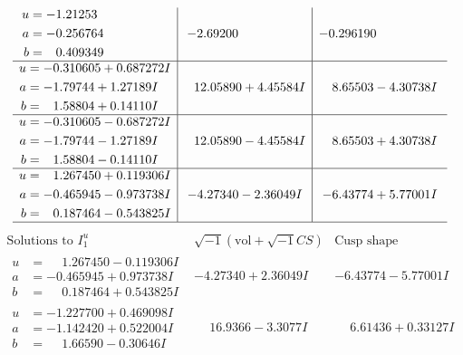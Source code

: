 \documentclass[1p]{elsarticle_modified}
\theoremstyle{definition}
\newcommand{\I}{\sqrt{-1}}
\begin{document}
$$\begin{array}{c|c|c}
\begin{aligned}
u &= -1.21253\phantom{ +0.000000I} \\
a &= -0.256764\phantom{ +0.000000I} \\
b &= \phantom{-}0.409349\phantom{ +0.000000I}\end{aligned}
 & -2.69200\phantom{ +0.000000I} & -0.296190\phantom{ +0.000000I} \\ \hline\begin{aligned}
u &= -0.310605 + 0.687272 I \\
a &= -1.79744 + 1.27189 I \\
b &= \phantom{-}1.58804 + 0.14110 I\end{aligned}
 & \phantom{-}12.05890 + 4.45584 I & \phantom{-}8.65503 - 4.30738 I \\ \hline\begin{aligned}
u &= -0.310605 - 0.687272 I \\
a &= -1.79744 - 1.27189 I \\
b &= \phantom{-}1.58804 - 0.14110 I\end{aligned}
 & \phantom{-}12.05890 - 4.45584 I & \phantom{-}8.65503 + 4.30738 I \\ \hline\begin{aligned}
u &= \phantom{-}1.267450 + 0.119306 I \\
a &= -0.465945 - 0.973738 I \\
b &= \phantom{-}0.187464 - 0.543825 I\end{aligned}
 & -4.27340 - 2.36049 I & -6.43774 + 5.77001 I\\
 \hline 
 \end{array}$$\newpage$$\begin{array}{c|c|c}  
\text{Solutions to }I^u_{1}& \I (\text{vol} + \sqrt{-1}CS) & \text{Cusp shape}\\
 \hline 
\begin{aligned}
u &= \phantom{-}1.267450 - 0.119306 I \\
a &= -0.465945 + 0.973738 I \\
b &= \phantom{-}0.187464 + 0.543825 I\end{aligned}
 & -4.27340 + 2.36049 I & -6.43774 - 5.77001 I \\ \hline\begin{aligned}
u &= -1.227700 + 0.469098 I \\
a &= -1.142420 + 0.522004 I \\
b &= \phantom{-}1.66590 - 0.30646 I\end{aligned}
 & \phantom{-}16.9366 - 3.3077 I & \phantom{-}6.61436 + 0.33127 I \\ \hline\begin{aligned}

\end{aligned}
\end{array}$$
\end{document}
